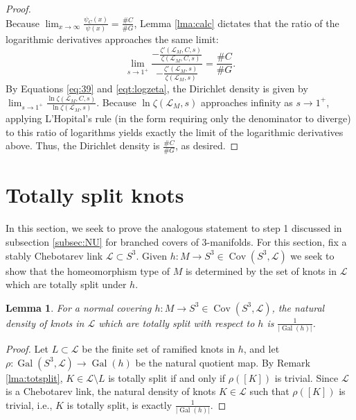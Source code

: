 \documentclass{amsart}
\theoremstyle{plain}
\theoremstyle{definition}
\theoremstyle{plain}
\theoremstyle{plain}
\theoremstyle{plain}
\newtheorem{lemma}[theorem]{Lemma}
\theoremstyle{remark}
\theoremstyle{remark}
\theoremstyle{plain}
\theoremstyle{definition}
\theoremstyle{plain}
\DeclareMathOperator{\Gal}{\mathrm{Gal}}
\DeclareMathOperator{\Cov}{\mathrm{Cov}}
\theoremstyle{plain}
\theoremstyle{plain}
\numberwithin{equation}{section}
\begin{document}
\begin{proof}
\begin{equation}
\end{equation}
Because $\lim_{x \to \infty}\frac{\psi_C(x)}{\psi(x)} = \frac{\#C}{\#G}$, Lemma \ref{lma:calc} dictates that the ratio of the logarithmic derivatives approaches the same limit:
\begin{equation}
    \lim_{s \to 1^+}\frac{-\frac{\zeta '(\mathcal{L}_M,C,s)}{\zeta(\mathcal{L}_M,C,s)}}{-\frac{\zeta '(\mathcal{L}_M,s)}{\zeta(\mathcal{L}_M,s)}}=\frac{\#C}{\#G}.
\end{equation}
By Equations \ref{eq:39} and \ref{eqt:logzeta}, the Dirichlet density is given by $\lim_{s \to 1^+}\frac{\ln\zeta(\mathcal{L}_M, C, s)}{\ln\zeta(\mathcal{L}_M, s)}$. Because $\ln\zeta(\mathcal{L}_M, s)$ approaches infinity as $s \to 1^+$, applying L'Hopital's rule (in the form requiring only the denominator to diverge) to this ratio of logarithms yields exactly the limit of the logarithmic derivatives above. Thus, the Dirichlet density is $\frac{\#C}{\#G}$, as desired.
\end{proof}


\section{Totally split knots}\label{sec:totsplit}

In this section, we seek to prove the analogous statement to step 1 discussed in subsection \ref{subsec:NU} for branched covers of 3-manifolds. For this section, fix a stably Chebotarev link $\mathcal{L} \subset S^3$. Given $h: M \to S^3 \in \Cov(S^3, \mathcal{L})$ we seek to show that the homeomorphism type of $M$ is determined by the set of knots in $\mathcal{L}$ which are totally split under $h$. 

\begin{lemma}\label{lma:densitytotallysplit}
For a normal covering $h: M \to S^3 \in \Cov(S^3, \mathcal{L})$, the natural density of knots in $\mathcal{L}$ which are totally split with respect to $h$ is $\frac{1}{|\Gal(h)|}$.
\end{lemma}

\begin{proof}
Let $L \subset \mathcal{L}$ be the finite set of ramified knots in $h$, and let $\rho: \Gal(S^3, \mathcal{L}) \to \Gal(h)$ be the natural quotient map. By Remark \ref{lma:totsplit}, $K \in \mathcal{L} \setminus L$ is totally split if and only if $\rho([K])$ is trivial. Since $\mathcal{L}$ is a Chebotarev link, the natural density of knots $K \in \mathcal{L}$ such that $\rho([K])$ is trivial, i.e., $K$ is totally split, is exactly $\frac{1}{|\Gal(h)|}$. 
\end{proof}
\end{document}
